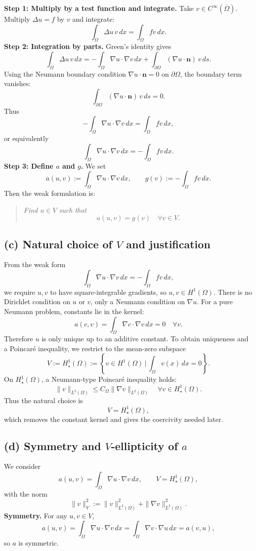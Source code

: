 \textbf{Step 1: Multiply by a test function and integrate.}
Take $v \in C^\infty(\overline{\Omega})$. Multiply $\Delta u = f$ by $v$ and integrate:
\[
    \int_\Omega \Delta u \, v\,dx = \int_\Omega f v\,dx.
\]
\textbf{Step 2: Integration by parts.}
Green's identity gives
\[
    \int_\Omega \Delta u\,v\,dx
    = - \int_\Omega \nabla u \cdot \nabla v\,dx
    + \int_{\partial\Omega} (\nabla u\cdot \mathbf{n})\, v\,ds.
\]
Using the Neumann boundary condition $\nabla u \cdot \mathbf{n} = 0$ on $\partial\Omega$, the boundary term vanishes:
\[
    \int_{\partial\Omega} (\nabla u \cdot \mathbf{n})\,v\,ds = 0.
\]
Thus
\[
    - \int_\Omega \nabla u \cdot \nabla v\,dx
    = \int_\Omega f v\,dx,
\]
or equivalently
\[
    \int_\Omega \nabla u \cdot \nabla v\,dx
    = - \int_\Omega f v\,dx.
\]
\textbf{Step 3: Define $a$ and $g$.}
We set
\[
    a(u,v) := \int_\Omega \nabla u \cdot \nabla v\,dx,
    \qquad
    g(v) := -\int_\Omega f v\,dx.
\]
Then the weak formulation is:
\begin{quote}
    \emph{Find $u \in V$ such that}
    \[
        a(u,v) = g(v) \quad \forall v \in V.
    \]
\end{quote}
\subsection*{(c) Natural choice of $V$ and justification}
From the weak form
\[
    \int_\Omega \nabla u \cdot \nabla v\,dx = -\int_\Omega f v\,dx,
\]
we require $u,v$ to have square-integrable gradients, so $u,v \in H^1(\Omega)$.
There is no Dirichlet condition on $u$ or $v$, only a Neumann condition on $\nabla u$. For a pure Neumann problem, constants lie in the kernel:
\[
    a(c,v) = \int_\Omega \nabla c \cdot \nabla v\,dx = 0 \quad \forall v.
\]
Therefore $u$ is only unique up to an additive constant. To obtain uniqueness and a Poincar\'e inequality, we restrict to the mean-zero subspace
\[
    V := H^1_\star(\Omega)
    := \left\{ v \in H^1(\Omega) \,\bigg|\, \int_\Omega v(x)\,dx = 0 \right\}.
\]
On $H^1_\star(\Omega)$, a Neumann-type Poincar\'e inequality holds:
\[
    \|v\|_{L^2(\Omega)} \le C_\Omega \|\nabla v\|_{L^2(\Omega)}
    \quad \forall v \in H^1_\star(\Omega).
\]
Thus the natural choice is
\[
    V = H^1_\star(\Omega),
\]
which removes the constant kernel and gives the coercivity needed later.
\subsection*{(d) Symmetry and $V$-ellipticity of $a$}
We consider
\[
    a(u,v) = \int_\Omega \nabla u \cdot \nabla v\,dx,
    \qquad V = H^1_\star(\Omega),
\]
with the norm
\[
    \|v\|_V^2 := \|v\|_{L^2(\Omega)}^2 + \|\nabla v\|_{L^2(\Omega)}^2.
\]
\textbf{Symmetry.}
For any $u,v \in V$,
\[
    a(u,v) = \int_\Omega \nabla u \cdot \nabla v\,dx
    = \int_\Omega \nabla v \cdot \nabla u\,dx
    = a(v,u),
\]
so $a$ is symmetric.

